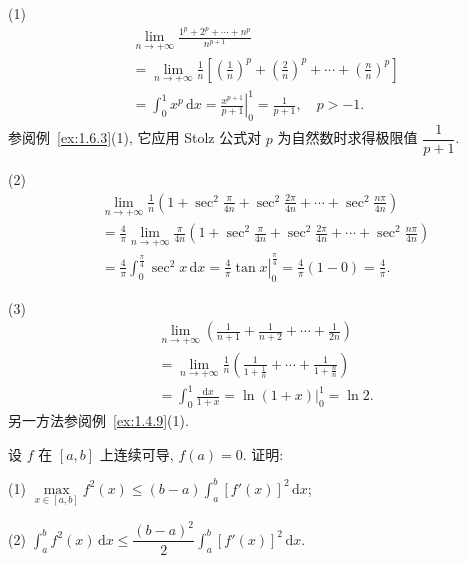 \begin{solution}
(1)
\[
\begin{aligned}
&\lim_{n\to+\infty}\frac{1^{p}+2^{p}+\cdots+n^{p}}{n^{p+1}}\\
&=\lim_{n\to+\infty}\frac{1}{n}\left[\left(\frac{1}{n}\right)^{p}+\left(\frac{2}{n}\right)^{p}+\cdots+\left(\frac{n}{n}\right)^{p}\right]\\
&=\int_{0}^{1}x^{p}\,\mathrm{d}x=\left.\frac{x^{p+1}}{p+1}\right|_{0}^{1}=\frac{1}{p+1},\quad p>-1.
\end{aligned}
\]
参阅例~\ref{ex:1.6.3}(1), 它应用 Stolz 公式对 $p$ 为自然数时求得极限值 $\dfrac{1}{p+1}$.

(2)
\[
\begin{aligned}
&\lim_{n\to+\infty}\frac{1}{n}\left(1+\sec^{2}\frac{\pi}{4n}+\sec^{2}\frac{2\pi}{4n}+\cdots+\sec^{2}\frac{n\pi}{4n}\right)\\
&=\frac{4}{\pi}\lim_{n\to+\infty}\frac{\pi}{4n}\left(1+\sec^{2}\frac{\pi}{4n}+\sec^{2}\frac{2\pi}{4n}+\cdots+\sec^{2}\frac{n\pi}{4n}\right)\\
&=\frac{4}{\pi}\int_{0}^{\frac{\pi}{4}}\sec^{2}x\,\mathrm{d}x=\left.\frac{4}{\pi}\tan x\right|_{0}^{\frac{\pi}{4}}=\frac{4}{\pi}(1-0)=\frac{4}{\pi}.
\end{aligned}
\]

(3)
\[
\begin{aligned}
&\lim_{n\to+\infty}\left(\frac{1}{n+1}+\frac{1}{n+2}+\cdots+\frac{1}{2n}\right)\\
&=\lim_{n\to+\infty}\frac{1}{n}\left(\frac{1}{1+\frac{1}{n}}+\cdots+\frac{1}{1+\frac{n}{n}}\right)\\
&=\int_{0}^{1}\frac{\mathrm{d}x}{1+x}=\left.\ln(1+x)\right|_{0}^{1}=\ln 2.
\end{aligned}
\]
另一方法参阅例~\ref{ex:1.4.9}(1).
\end{solution}

\begin{example}\label{ex:6.3.5}
设 $f$ 在 $[a,b]$ 上连续可导, $f(a)=0$. 证明:

(1) $\max\limits_{x\in[a,b]}f^{2}(x)\leqslant(b-a)\int_{a}^{b}[f'(x)]^{2}\,\mathrm{d}x$;

(2) $\int_{a}^{b}f^{2}(x)\,\mathrm{d}x\leqslant\dfrac{(b-a)^{2}}{2}\int_{a}^{b}[f'(x)]^{2}\,\mathrm{d}x$.
\end{example}

